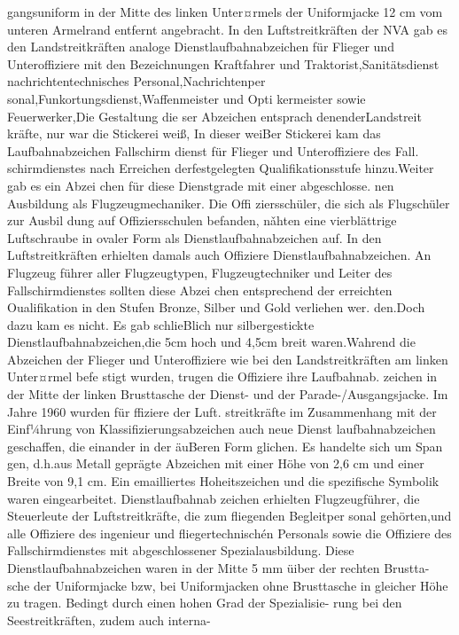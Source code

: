 gangsuniform in der Mitte des linken Unter¤rmels
der Uniformjacke 12 cm vom unteren Armelrand
entfernt angebracht.
In den Luftstreitkräften der NVA gab es den
Landstreitkräften analoge Dienstlaufbahnabzeichen
für Flieger und Unteroffiziere mit den Bezeichnungen Kraftfahrer und Traktorist,Sanitätsdienst
nachrichtentechnisches Personal,Nachrichtenper
sonal,Funkortungsdienst,Waffenmeister und Opti
kermeister sowie Feuerwerker,Die Gestaltung die
ser Abzeichen entsprach denenderLandstreit
kräfte, nur war die Stickerei weiß, In dieser weiBer
Stickerei kam das Laufbahnabzeichen Fallschirm
dienst für Flieger und Unteroffiziere des Fall.
schirmdienstes nach Erreichen derfestgelegten
Qualifikationsstufe hinzu.Weiter gab es ein Abzei
chen für diese Dienstgrade mit einer abgeschlosse.
nen Ausbildung als Flugzeugmechaniker. Die Offi
ziersschüler, die sich als Flugschüler zur Ausbil
dung auf Offiziersschulen befanden, nǎhten eine
vierblättrige Luftschraube in ovaler Form als
Dienstlaufbahnabzeichen auf.
In den Luftstreitkräften erhielten damals auch
Offiziere Dienstlaufbahnabzeichen. An Flugzeug
führer aller Flugzeugtypen, Flugzeugtechniker und
Leiter des Fallschirmdienstes sollten diese Abzei
chen entsprechend der erreichten Oualifikation in
den Stufen Bronze, Silber und Gold verliehen wer.
den.Doch dazu kam es nicht. Es gab schlieBlich
nur silbergestickte Dienstlaufbahnabzeichen,die
5cm hoch und 4,5cm breit waren.Wahrend die
Abzeichen der Flieger und Unteroffiziere wie bei
den Landstreitkräften am linken Unter¤rmel befe
stigt wurden, trugen die Offiziere ihre Laufbahnab.
zeichen in der Mitte der linken Brusttasche der
Dienst- und der Parade-/Ausgangsjacke.
Im Jahre 1960 wurden für ffiziere der Luft.
streitkräfte im Zusammenhang mit der Einf¼hrung
von Klassifizierungsabzeichen auch neue Dienst
laufbahnabzeichen geschaffen, die einander in der
äuBeren Form glichen. Es handelte sich um Span
gen, d.h.aus Metall geprägte Abzeichen mit einer
Höhe von 2,6 cm und einer Breite von 9,1 cm. Ein
emailliertes Hoheitszeichen und die spezifische
Symbolik waren eingearbeitet. Dienstlaufbahnab
zeichen erhielten Flugzeugführer, die Steuerleute
der Luftstreitkräfte, die zum fliegenden Begleitper
sonal gehörten,und alle Offiziere des ingenieur
und fliegertechnischén Personals sowie die Offiziere des Fallschirmdienstes mit abgeschlossener
Spezialausbildung. Diese Dienstlaufbahnabzeichen
waren in der Mitte 5 mm üiber der rechten Brustta-
sche der Uniformjacke bzw, bei Uniformjacken
ohne Brusttasche in gleicher Höhe zu tragen.
Bedingt durch einen hohen Grad der Spezialisie-
rung bei den Seestreitkräften, zudem auch interna-
